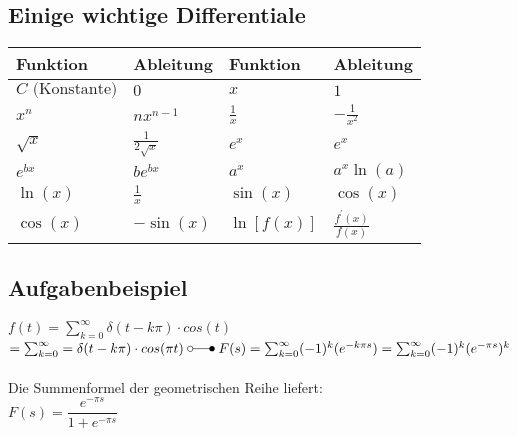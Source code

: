 \subsection{Einige wichtige Differentiale}
\begin{multicols}{2}
	\begin{tabular}{|l|l||l|l|}
    	\hline
    	\textbf{Funktion} & \textbf{Ableitung} & \textbf{Funktion} &
    	\textbf{Ableitung}\\
    	\hline
    	\hline
    	$C \text{ (Konstante)}$ & $0$ & $x$ & $1$\\
    	\hline
    	$x^n$ & $nx^{n-1}$ & $\frac1x$ & $-\frac{1}{x^2}$\\
    	\hline
    	$\sqrt{x}$ & $\frac{1}{2\sqrt{x}}$ & $e^x$ & $e^x$\\
    	\hline
    	$e^{bx}$ & $be^{bx}$ & $a^x$ & $a^x \ln(a)$\\
    	\hline
    	$\ln(x)$ & $\frac1x$ & $\sin(x)$ & $\cos(x)$\\
    	\hline
    	$\cos(x)$ & $-\sin(x)$ & $\ln[f(x)]$ & $\frac{f^{'}(x)}{f(x)}$\\
    	\hline	
    \end{tabular}
\columnbreak  	
\subsection{Aufgabenbeispiel}
$f(t) =\sum_{k=0}^{\infty}\delta (t-k\pi) \cdot cos(t)$ \\
$ = \sum_{k=0}^{\infty} = \delta (t-k\pi) \cdot cos(\pi t)  \\
\; \laplace \; 
F(s) = \sum_{k=0}^{\infty} (-1)^k(e^{-k\pi s}) \\
= \sum_{k=0}^{\infty} (-1)^k(e^{-\pi s})^k$ 
\\ \\
Die Summenformel der geometrischen Reihe liefert: \\
$F(s) = \dfrac{e^{-\pi s}}{1 +e^{-\pi s}}$ \\

\end{multicols}
\renewcommand{\arraystretch}{\arraystretchOriginal} 